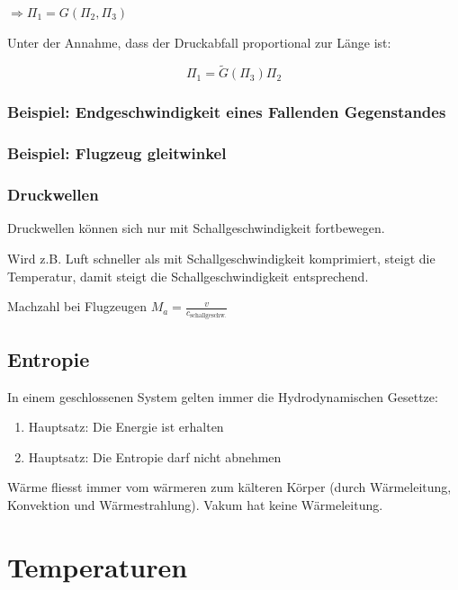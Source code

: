 \documentclass[a4paper]{scrartcl}
\begin{document}
$\Rightarrow \Pi_1 = G(\Pi_2, \Pi_3)$

Unter der Annahme, dass der Druckabfall proportional zur Länge ist:

\[
	\Pi_1 = \tilde{G}(\Pi_3)\Pi_2
\]



\subsubsection{Beispiel: Endgeschwindigkeit eines Fallenden Gegenstandes}


\subsubsection{Beispiel: Flugzeug gleitwinkel}



\subsubsection{Druckwellen}

Druckwellen können sich nur mit Schallgeschwindigkeit fortbewegen.

Wird z.B. Luft schneller als mit Schallgeschwindigkeit komprimiert, steigt die Temperatur, damit steigt die Schallgeschwindigkeit entsprechend.

Machzahl bei Flugzeugen $M_a = \frac{v}{c_{\text{schallgeschw.}}}$




\subsection{Entropie}

In einem geschlossenen System gelten immer die Hydrodynamischen Gesettze:

\begin{enumerate}
	\item Hauptsatz: Die Energie ist erhalten
	\item Hauptsatz: Die Entropie darf nicht abnehmen
\end{enumerate}

Wärme fliesst immer vom wärmeren zum kälteren Körper (durch Wärmeleitung, Konvektion und Wärmestrahlung). Vakum hat keine Wärmeleitung.


\section{Temperaturen}
\end{document}
